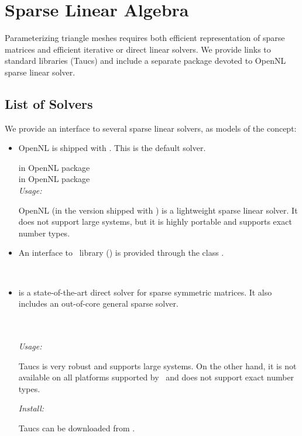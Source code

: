 \section{Sparse Linear Algebra \label{sec:Sparse-Linear-Algebra}}

Parameterizing triangle meshes requires both efficient representation
of sparse matrices and efficient iterative or direct linear
solvers. We provide links to standard libraries ({\sc Taucs})
and include a separate package devoted to OpenNL sparse linear solver.

\subsection{List of Solvers}

We provide an interface to several sparse linear solvers, as models
of the  concept:

\begin{itemize}

\item
    OpenNL \cite{cgal:l-nmdgp-05} is shipped with \cgal. This is the default solver.

     in OpenNL package  \\
     in OpenNL package  \\

    \emph{Usage:}

    OpenNL (in the version shipped with \cgal) is a lightweight sparse linear solver.
    It does not support large systems, but it is highly portable and
    supports exact number types.

\item
    An interface to \eigen\ library (\eigenpage) is provided through the class
    .
    
    \\


\item
    is a state-of-the-art direct solver for sparse symmetric matrices.
    It also includes an out-of-core general sparse solver.

      \\
      \\

    \emph{Usage:}

    {\sc Taucs} is very robust and supports large systems.
    On the other hand, it is not available on all platforms
    supported by \cgal\ and does not support exact number types.

    \emph{Install:}

    {\sc Taucs} can be downloaded from
    {}.

\end{itemize}


